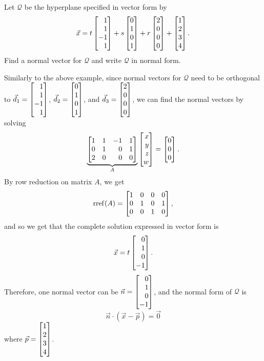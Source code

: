 \begin{example}
	Let $\mathcal Q$ be the hyperplane specified in vector form by
	\[
		\vec x=t\mat{1\\1\\-1\\1}+s\mat{0\\1\\0\\1}+r\mat{2\\0\\0\\0}+\mat{1\\2\\3\\4}.
	\]
	Find a normal vector for $\mathcal Q$ and write $\mathcal Q$ in normal form.

	Similarly to the above example, since normal vectors for $\mathcal Q$ need to be orthogonal to $\vec d_1=\mat{1\\1\\-1\\1}$, $\vec d_2=\mat{0\\1\\0\\1}$, and $\vec d_3=\mat{2\\0\\0\\0}$, we can find the normal vectors by solving
	\[
	\underbrace{\mat{1&1&-1&1\\0&1&0&1\\2&0&0&0}}_A\mat{x\\y\\z\\w}=\mat{0\\0\\0}.
    \]
    By row reduction on matrix $A$, we get
    \[
        \Rref(A) = \mat{1&0&0&0\\0&1&0&1\\0&0&1&0},
    \]
    and so we get that the complete solution expressed in vector form is
    \[
        \vec x = t\mat{0\\1\\0\\-1}.
	\]
    Therefore, one normal vector can be $\vec n =\mat{0\\1\\0\\-1}$, and the normal form of $\mathcal Q$ is 
    \[
        \vec n\cdot(\vec x-\vec p)=\vec 0
    \]
    where $\vec p=\mat{1\\2\\3\\4}$.
\end{example}



